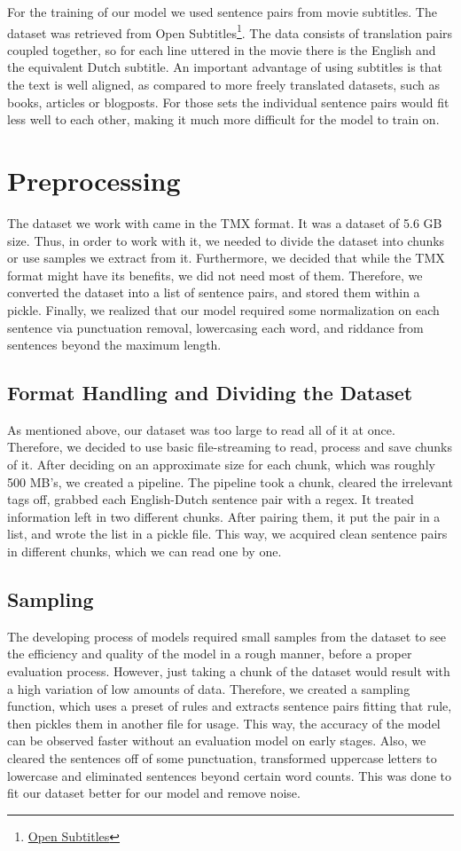 \documentclass[11pt]{article}
\begin{document}
For the training of our model we used sentence pairs from movie subtitles. The dataset was retrieved from Open Subtitles\footnote[2]{\href{http://opus.nlpl.eu/OpenSubtitles-v2018.php}{Open Subtitles}}. The data consists of translation pairs coupled together, so for each line uttered in the movie there is the English and the equivalent Dutch subtitle. An important advantage of using subtitles is that the text is well aligned, as compared to more freely translated datasets, such as books, articles or blogposts. For those sets the individual sentence pairs would fit less well to each other, making it much more difficult for the model to train on.

\section{Preprocessing}
The dataset we work with came in the TMX format. It was a dataset of 5.6 GB size. Thus, in order to work with it, we needed to divide the dataset into chunks or use samples we extract from it. Furthermore, we decided that while the TMX format might have its benefits, we did not need most of them. Therefore, we converted the dataset into a list of sentence pairs, and stored them within a pickle. Finally, we realized that our model required some normalization on each sentence via punctuation removal, lowercasing each word, and riddance from sentences beyond the maximum length.

\subsection{Format Handling and Dividing the Dataset}
As mentioned above, our dataset was too large to read all of it at once. Therefore, we decided to use basic file-streaming to read, process and save chunks of it. After deciding on an approximate size for each chunk, which was roughly 500 MB's, we created a pipeline. The pipeline took a chunk, cleared the irrelevant tags off, grabbed each English-Dutch sentence pair with a regex. It treated information left in two different chunks. After pairing them, it put the pair in a list, and wrote the list in a pickle file. This way, we acquired clean sentence pairs in different chunks, which we can read one by one.

\subsection{Sampling}
The developing process of models required small samples from the dataset to see the efficiency and quality of the model in a rough manner, before a proper evaluation process. However, just taking a chunk of the dataset would result with a high variation of low amounts of data. Therefore, we created a sampling function, which uses a preset of rules and extracts sentence pairs fitting that rule, then pickles them in another file for usage. This way, the accuracy of the model can be observed faster without an evaluation model on early stages. Also, we cleared the sentences off of some punctuation, transformed uppercase letters to lowercase and eliminated sentences beyond certain word counts. This was done to fit our dataset better for our model and remove noise.
\end{document}
